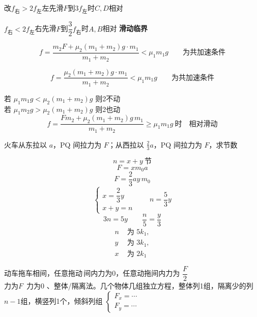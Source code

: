 改\quad $f_{\text{右}}>2f_{\text{左}}$\quad 左先滑\quad $F$到$3f_{\text{左}}$时\quad $C,D$相对 %

$f_{\text{右}}<2f_{\text{左}}$\quad 右先滑\quad $F$到$\dfrac32f_{\text{右}}$时\quad $A,B$相对 %
\textbf{滑动临界}

\[ f=\frac{m_2F+\mu_2(m_1+m_2)g\cdot m_1}{m_1+m_2}<\mu_1m_1g\qquad\text{为共加速条件} \]

\[ f=\frac{\mu_2(m_1+m_2)g\cdot m_1}{m_1+m_2}<\mu_1m_1g\qquad\text{为共加速条件} \]


\noindent 若 $\mu_1m_1g<\mu_2(m_1+m_2)g$ 则2不动 \\
若 $\mu_1m_2g>\mu_2(m_1+m_2)g$ 则2也动 %
\[ f=\frac{Fm_2+\mu_2(m_1+m_2)g\,m_1}{m_1+m_2}\ge\mu_1m_1g\ \text{时}\quad\text{相对滑动} \]
\begin{problem}[2、]
火车从东拉以 $a$，PQ 间拉力为 $F$；从西拉以 $\frac23a$，PQ 间拉力为 $F$，求节数
\begin{solution}
\[ n=x+y\ \text{节} \]
\[ F=xm_0a \]
\[ F=\frac23ay\,m_0 \]
\[ \begin{cases} x=\dfrac23y\\ x+y=n\end{cases}\qquad n=\frac53y \]
\[ 3n=5y\qquad \frac n5=\frac y3 \]
\[ \begin{aligned} n&\text{ 为 }5k_1,\\ y&\text{ 为 }3k_1,\\ x&\text{ 为 }2k_1\end{aligned} \]
\end{solution}
\end{problem}

\noindent 动车拖车相间，任意拖动\,间内力为0，任意动拖间内力为 $\dfrac F2$ \\
力为$F$\ 力为0
、整体/隔离法。几个物体几组独立方程，整体列1组，隔离少的列$n-1$组，横竖列1个，倾斜列组 \quad $\begin{cases}F_x=\cdots\\ F_y=\cdots\end{cases}$

